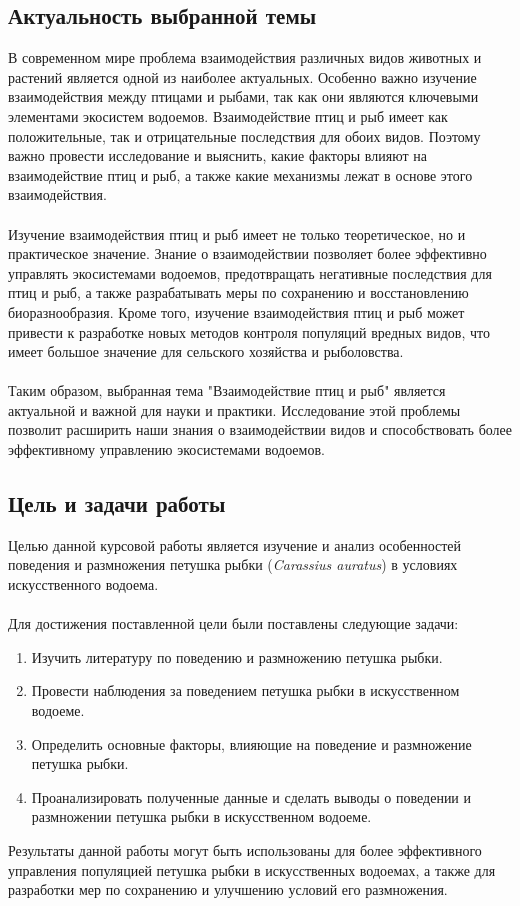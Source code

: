 \documentclass{article}
\begin{document}
\subsection{Актуальность выбранной темы}
В современном мире проблема взаимодействия различных видов животных и растений является одной из наиболее актуальных. Особенно важно изучение взаимодействия между птицами и рыбами, так как они являются ключевыми элементами экосистем водоемов. Взаимодействие птиц и рыб имеет как положительные, так и отрицательные последствия для обоих видов. Поэтому важно провести исследование и выяснить, какие факторы влияют на взаимодействие птиц и рыб, а также какие механизмы лежат в основе этого взаимодействия.\\
~\\
Изучение взаимодействия птиц и рыб имеет не только теоретическое, но и практическое значение. Знание о взаимодействии позволяет более эффективно управлять экосистемами водоемов, предотвращать негативные последствия для птиц и рыб, а также разрабатывать меры по сохранению и восстановлению биоразнообразия. Кроме того, изучение взаимодействия птиц и рыб может привести к разработке новых методов контроля популяций вредных видов, что имеет большое значение для сельского хозяйства и рыболовства.\\
~\\
Таким образом, выбранная тема "{}{}Взаимодействие птиц и рыб"{}{} является актуальной и важной для науки и практики. Исследование этой проблемы позволит расширить наши знания о взаимодействии видов и способствовать более эффективному управлению экосистемами водоемов.
\subsection{Цель и задачи работы}
Целью данной курсовой работы является изучение и анализ особенностей поведения и размножения петушка рыбки (\textit{Carassius auratus}) в условиях искусственного водоема.\\
~\\
Для достижения поставленной цели были поставлены следующие задачи:
\begin{enumerate}
\item Изучить литературу по поведению и размножению петушка рыбки.
\item Провести наблюдения за поведением петушка рыбки в искусственном водоеме.
\item Определить основные факторы, влияющие на поведение и размножение петушка рыбки.
\item Проанализировать полученные данные и сделать выводы о поведении и размножении петушка рыбки в искусственном водоеме.
\end{enumerate}
Результаты данной работы могут быть использованы для более эффективного управления популяцией петушка рыбки в искусственных водоемах, а также для разработки мер по сохранению и улучшению условий его размножения.\\
~\\
\end{document}

